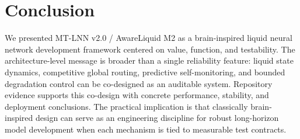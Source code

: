 \documentclass[10pt,twocolumn]{article}
\begin{document}
\FloatBarrier

\section{Conclusion}
We presented MT-LNN v2.0 / AwareLiquid M2 as a brain-inspired liquid neural network development framework centered on value, function, and testability. The architecture-level message is broader than a single reliability feature: liquid state dynamics, competitive global routing, predictive self-monitoring, and bounded degradation control can be co-designed as an auditable system. Repository evidence supports this co-design with concrete performance, stability, and deployment conclusions. The practical implication is that classically brain-inspired design can serve as an engineering discipline for robust long-horizon model development when each mechanism is tied to measurable test contracts.

\clearpage
\balance
\end{document}
